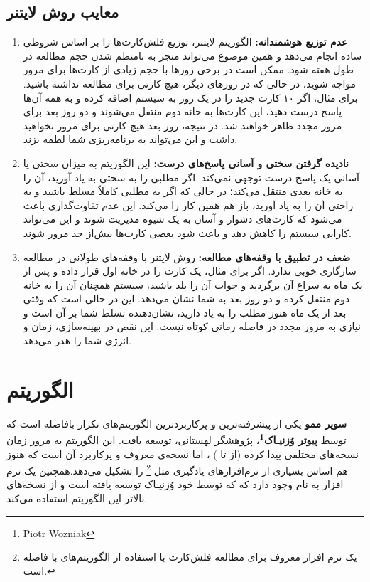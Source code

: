 \documentclass[12pt]{report}
\begin{document}
\section{معایب روش لایتنر}
\begin{enumerate}
    \item \textbf{عدم توزیع هوشمندانه:} الگوریتم لایتنر، توزیع فلش‌کارت‌ها را بر اساس شروطی ساده انجام می‌دهد و همین موضوع می‌تواند منجر به نامنظم شدن حجم مطالعه در طول هفته شود. ممکن است در برخی روزها با حجم زیادی از کارت‌ها برای مرور مواجه شوید، در حالی که در روزهای دیگر، هیچ کارتی برای مطالعه نداشته باشید. برای مثال، اگر ۱۰ کارت جدید را در یک روز به سیستم اضافه کرده و به همه آن‌ها پاسخ درست دهید، این کارت‌ها به خانه دوم منتقل می‌شوند و دو روز بعد برای مرور مجدد ظاهر خواهند شد. در نتیجه، روز بعد هیچ کارتی برای مرور نخواهید داشت و این می‌تواند به برنامه‌ریزی شما لطمه بزند.
    \item \textbf{نادیده گرفتن سختی و آسانی پاسخ‌های درست:} این الگوریتم به میزان سختی یا آسانی یک پاسخ درست توجهی نمی‌کند. اگر مطلبی را به سختی به یاد آورید، آن را به خانه بعدی منتقل می‌کند؛ در حالی که اگر به مطلبی کاملاً مسلط باشید و به راحتی آن را به یاد آورید، باز هم همین کار را می‌کند. این عدم تفاوت‌گذاری باعث می‌شود که کارت‌های دشوار و آسان به یک شیوه مدیریت شوند و این می‌تواند کارایی سیستم را کاهش دهد و باعث شود بعضی کارت‌ها بیش‌از حد مرور شوند.
    \item \textbf{ضعف در تطبیق با وقفه‌های مطالعه:} روش لایتنر با وقفه‌های طولانی در مطالعه سازگاری خوبی ندارد. اگر برای مثال، یک کارت را در خانه اول قرار داده و پس از یک ماه به سراغ آن برگردید و جواب آن را بلد باشید، سیستم همچنان آن را به خانه دوم منتقل کرده و دو روز بعد به شما نشان می‌دهد. این در حالی است که وقتی بعد از یک ماه هنوز مطلب را به یاد دارید، نشان‌دهنده تسلط شما بر آن است و نیازی به مرور مجدد در فاصله زمانی کوتاه نیست. این نقص در بهینه‌سازی، زمان و انرژی شما را هدر می‌دهد.
\end{enumerate}

\chapter{الگوریتم }

\textbf{سوپر ممو} 
یکی از پیشرفته‌ترین و پرکاربردترین الگوریتم‌های تکرار بافاصله است که توسط 
\textbf{پیوتر وُزنیـاک\footnote{Piotr Wozniak}}، پژوهشگر لهستانی، توسعه یافت. این الگوریتم به مرور زمان نسخه‌های مختلفی پیدا کرده (از  تا )
، اما نسخه‌ی معروف و پرکاربرد آن \textbf{} است که هنوز هم اساس بسیاری از نرم‌افزارهای یادگیری 
مثل 
\footnote{ یک نرم افزار معروف برای مطالعه فلش‌کارت با استفاده از الگوریتم‌های با فاصله است.}
را تشکیل می‌دهد.همچنین یک نرم افزار به نام 
 وجود دارد که 
که توسط خود وُزنیـاک توسعه یافته است
و از نسخه‌های بالاتر این الگوریتم استفاده می‌کند.
\end{document}
